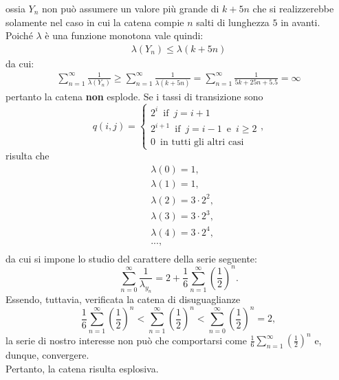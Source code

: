 \documentclass[11pt,largemargins]{homework}
\begin{document}
\begin{alphaparts}
ossia \(Y_n\) non può assumere un valore più grande di \(k+5n\) che si realizzerebbe solamente nel caso in cui la catena compie \(n\) salti di lunghezza \(5\) in avanti.
\\
Poiché \(\lambda\) è una funzione monotona vale quindi:
\begin{gather*}
  \lambda(Y_n) \leq \lambda(k+5n)
\end{gather*}
da cui:
\begin{gather*}
   \sum \limits_{n=1}^{\infty} \frac{1}{\lambda(Y_n)} \geq  \sum \limits_{n=1}^{\infty} \frac{1}{\lambda(k+5n)}=
    \sum \limits_{n=1}^{\infty} \frac{1}{5k + 25n + 5.5} = \infty
\end{gather*}
pertanto la catena \textbf{non} esplode.
  \questionpart
  Se i tassi di transizione sono
  \begin{equation*}
  q\left(i,j\right)=\begin{cases}2^{i} \,\,\,\text{if}\,\,\,j=i+1\\2^{i+1} \,\,\,\text{if}\,\,\,j=i-1\,\,\,\text{e}\,\,\,i\geq 2\\0 \,\,\, \text{in tutti gli altri casi}\end{cases},
  \end{equation*}
  risulta che
  \begin{align*}
&\lambda\left(0\right)= 1,\\
&\lambda\left(1\right)= 1,\\
&\lambda\left(2\right)= 3\cdot 2^{2},\\
&\lambda\left(3\right)=3\cdot 2^{3},\\
&\lambda\left(4\right)=3\cdot 2^{4},\\
&...,\\
\end{align*}
da cui si impone lo studio del carattere della serie seguente:
\begin{equation*}
\sum_{n=0}^{\infty}\frac{1}{\lambda_{y_{n}}}=2+\frac{1}{6}\sum_{n=1}^{\infty}\left(\frac{1}{2}\right)^{n}.
\end{equation*}
Essendo, tuttavia, verificata la catena di disuguaglianze
\begin{equation*}
\frac{1}{6}\sum_{n=1}^{\infty}\left(\frac{1}{2}\right)^{n}<\sum_{n=1}^{\infty}\left(\frac{1}{2}\right)^{n}<\sum_{n=0}^{\infty}\left(\frac{1}{2}\right)^{n}=2,
\end{equation*}
la serie di nostro interesse non può che comportarsi come $\frac{1}{6}\sum_{n=1}^{\infty}\left(\frac{1}{2}\right)^{n}$  e, dunque, convergere. \\
Pertanto, la catena risulta esplosiva.
  \end{alphaparts}
  
\end{document}
